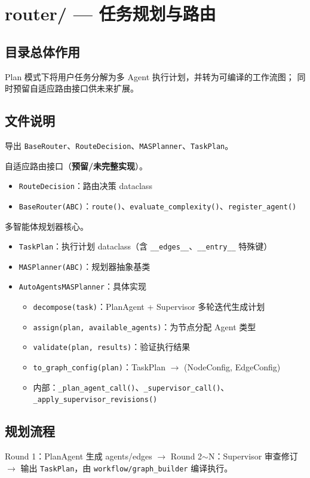 \section{router/ — 任务规划与路由}

\subsection{目录总体作用}

Plan 模式下将用户任务分解为多 Agent 执行计划，并转为可编译的工作流图；
同时预留自适应路由接口供未来扩展。

\subsection{文件说明}

\begin{description}[leftmargin=4em,style=nextline]
    \item[\texttt{\_\_init\_\_.py}]
    导出 \texttt{BaseRouter}、\texttt{RouteDecision}、\texttt{MASPlanner}、\texttt{TaskPlan}。

    \item[\texttt{base\_router.py}]
    自适应路由接口（\textbf{预留/未完整实现}）。
    \begin{itemize}
        \item \texttt{RouteDecision}：路由决策 dataclass
        \item \texttt{BaseRouter(ABC)}：\texttt{route()}、\texttt{evaluate\_complexity()}、\texttt{register\_agent()}
    \end{itemize}

    \item[\texttt{planner.py}]
    多智能体规划器核心。
    \begin{itemize}
        \item \texttt{TaskPlan}：执行计划 dataclass（含 \texttt{\_\_edges\_\_}、\texttt{\_\_entry\_\_} 特殊键）
        \item \texttt{MASPlanner(ABC)}：规划器抽象基类
        \item \texttt{AutoAgentsMASPlanner}：具体实现
        \begin{itemize}
            \item \texttt{decompose(task)}：PlanAgent + Supervisor 多轮迭代生成计划
            \item \texttt{assign(plan, available\_agents)}：为节点分配 Agent 类型
            \item \texttt{validate(plan, results)}：验证执行结果
            \item \texttt{to\_graph\_config(plan)}：TaskPlan $\rightarrow$ (NodeConfig, EdgeConfig)
            \item 内部：\texttt{\_plan\_agent\_call()}、\texttt{\_supervisor\_call()}、\texttt{\_apply\_supervisor\_revisions()}
        \end{itemize}
    \end{itemize}
\end{description}

\subsection{规划流程}

Round 1：PlanAgent 生成 agents/edges $\rightarrow$
Round 2$\sim$N：Supervisor 审查修订 $\rightarrow$
输出 \texttt{TaskPlan}，由 \texttt{workflow/graph\_builder} 编译执行。
